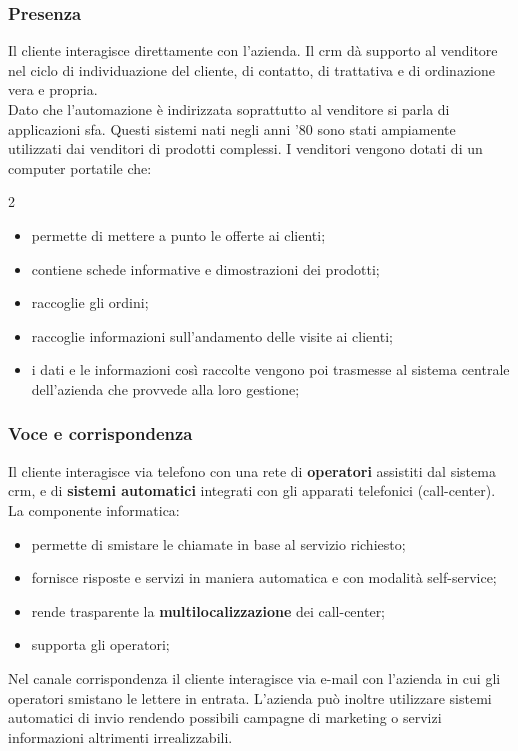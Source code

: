 \subsubsection{Presenza}\label{sub:crm_presenza} %
Il cliente interagisce direttamente con l'azienda.
Il \ac{crm} dà supporto al venditore nel ciclo di individuazione del cliente, di contatto, di trattativa e di ordinazione vera e propria.
\\
Dato che l'automazione è indirizzata soprattutto al venditore si parla di applicazioni \ac{sfa}.
Questi sistemi nati negli anni '80 sono stati ampiamente utilizzati dai venditori di prodotti complessi.
I venditori vengono dotati di un computer portatile che:
\begin{multicols}{2}
    \begin{itemize}
        \item permette di mettere a punto le offerte ai clienti;
        \item contiene schede informative e dimostrazioni dei prodotti;
        \item raccoglie gli ordini;
        \item raccoglie informazioni sull'andamento delle visite ai clienti;
        \item i dati e le informazioni così raccolte vengono poi trasmesse al sistema centrale dell'azienda che provvede alla loro gestione;
    \end{itemize}
\end{multicols}
%
\subsubsection{Voce e corrispondenza}\label{sub:crm_voce_e_corrispondenza} %
Il cliente interagisce via telefono con una rete di \textbf{operatori} assistiti dal sistema \ac{crm}, e di \textbf{sistemi automatici} integrati con gli apparati telefonici (call-center).
La componente informatica:
\begin{itemize}
    \item permette di smistare le chiamate in base al servizio richiesto;
    \item fornisce risposte e servizi in maniera automatica e con modalità self-service;
    \item rende trasparente la \textbf{multilocalizzazione} dei call-center;
    \item supporta gli operatori;
\end{itemize}
Nel canale corrispondenza il cliente interagisce via e-mail con l'azienda in cui gli operatori smistano le lettere in entrata.
L'azienda può inoltre utilizzare sistemi automatici di invio rendendo possibili campagne di marketing o servizi informazioni altrimenti irrealizzabili.
%
